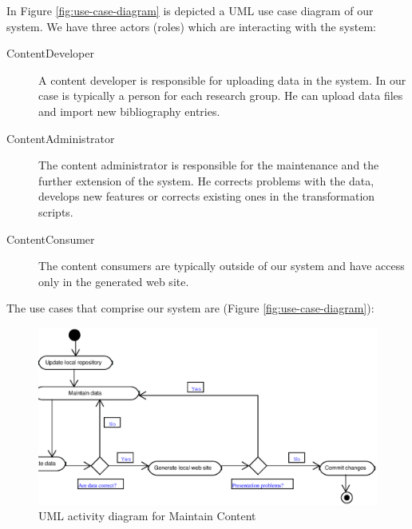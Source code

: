 \documentclass[10pt]{article}
\begin{document}
In Figure \ref{fig:use-case-diagram} is depicted a UML use case diagram of our system. 
We have three actors (roles) which are interacting with the system:

\begin{description}
\item[ContentDeveloper] A content developer is responsible for uploading data in the system. 
In our case is typically a person for each research group. He can upload data files and 
import new bibliography entries.

\item[ContentAdministrator] The content administrator is responsible for the maintenance 
and the further extension of the system. He corrects problems with the data, develops 
new features or corrects existing ones in the transformation scripts.

\item[ContentConsumer] The content consumers are typically outside of our system
and have access only in the generated web site.
\end{description}

The use cases that comprise our system are (Figure \ref{fig:use-case-diagram}):

\begin{figure}
\includegraphics[scale=0.5]{maintain-content-activity}
\caption{UML activity diagram for Maintain Content}
\label{fig:maintain-content-diagram}
\end{figure}
\end{document}
